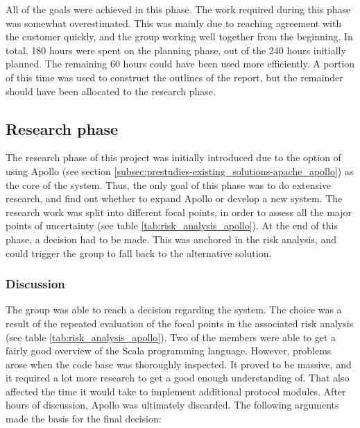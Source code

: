 All of the goals were achieved in this phase. The work required during this phase was somewhat overestimated. This was mainly due to reaching agreement with the customer quickly, and the group working well together from the beginning. In total, 180 hours were spent on the planning phase, out of the 240 hours initially planned. The remaining 60 hours could have been used more efficiently. A portion of this time was used to construct the outlines of the report, but the remainder should have been allocated to the research phase. 

\subsection{Research phase}
\label{subsec:project_lifecycle-planning_and_research-research_phase}

The research phase of this project was initially introduced due to the option of using Apollo (see section \ref{subsec:prestudies-existing_solutions-apache_apollo}) as the core of the system. Thus, the only goal of this phase was to do extensive research, and find out whether to expand Apollo or develop a new system. The research work was split into different focal points, in order to assess all the major points of uncertainty (see table \ref{tab:risk_analysis_apollo}). At the end of this phase, a decision had to be made. This was anchored in the risk analysis, and could trigger the group to fall back to the alternative solution.

\subsubsection{Discussion}
\label{subsec:project_lifecycle-planning_and_research-research_phase-discussion}

The group was able to reach a decision regarding the system. The choice was a result of the repeated evaluation of the focal points in the associated risk analysis (see table \ref{tab:risk_analysis_apollo}). Two of the members were able to get a fairly good overview of the Scala programming language. However, problems arose when the code base was thoroughly inspected. It proved to be massive, and it required a lot more research to get a good enough understanding of. That also affected the time it would take to implement additional protocol modules. After hours of discussion, Apollo was ultimately discarded. The following arguments made the basis for the final decision:

